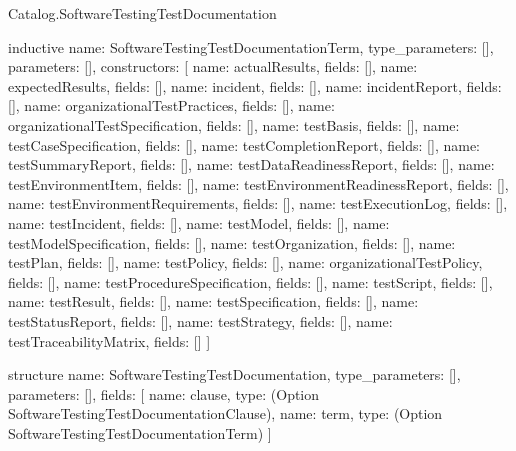 \begin{lexlean}{Catalog.SoftwareTestingTestDocumentation}
\begin{semanticmodule}
inductive{
  name: SoftwareTestingTestDocumentationTerm,
  type_parameters: [],
  parameters: [],
  constructors: [
    {name: actualResults, fields: []},
    {name: expectedResults, fields: []},
    {name: incident, fields: []},
    {name: incidentReport, fields: []},
    {name: organizationalTestPractices, fields: []},
    {name: organizationalTestSpecification, fields: []},
    {name: testBasis, fields: []},
    {name: testCaseSpecification, fields: []},
    {name: testCompletionReport, fields: []},
    {name: testSummaryReport, fields: []},
    {name: testDataReadinessReport, fields: []},
    {name: testEnvironmentItem, fields: []},
    {name: testEnvironmentReadinessReport, fields: []},
    {name: testEnvironmentRequirements, fields: []},
    {name: testExecutionLog, fields: []},
    {name: testIncident, fields: []},
    {name: testModel, fields: []},
    {name: testModelSpecification, fields: []},
    {name: testOrganization, fields: []},
    {name: testPlan, fields: []},
    {name: testPolicy, fields: []},
    {name: organizationalTestPolicy, fields: []},
    {name: testProcedureSpecification, fields: []},
    {name: testScript, fields: []},
    {name: testResult, fields: []},
    {name: testSpecification, fields: []},
    {name: testStatusReport, fields: []},
    {name: testStrategy, fields: []},
    {name: testTraceabilityMatrix, fields: []}
  ]
}

structure{
  name: SoftwareTestingTestDocumentation,
  type_parameters: [],
  parameters: [],
  fields: [
    {name: clause, type: (Option SoftwareTestingTestDocumentationClause)},
    {name: term, type: (Option SoftwareTestingTestDocumentationTerm)}
  ]
}
\end{semanticmodule}
\end{lexlean}
